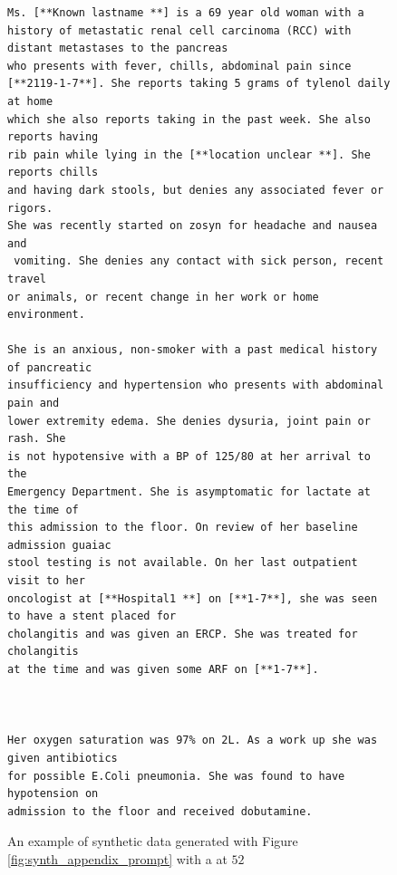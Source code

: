 \begin{figure}[hbt]
    \centering
    \begin{Verbatim}[breaklines=true, frame=single]
Ms. [**Known lastname **] is a 69 year old woman with a history of metastatic renal cell carcinoma (RCC) with distant metastases to the pancreas
who presents with fever, chills, abdominal pain since [**2119-1-7**]. She reports taking 5 grams of tylenol daily at home
which she also reports taking in the past week. She also reports having
rib pain while lying in the [**location unclear **]. She reports chills
and having dark stools, but denies any associated fever or rigors.
She was recently started on zosyn for headache and nausea and
 vomiting. She denies any contact with sick person, recent travel
or animals, or recent change in her work or home environment.

She is an anxious, non-smoker with a past medical history of pancreatic
insufficiency and hypertension who presents with abdominal pain and
lower extremity edema. She denies dysuria, joint pain or rash. She
is not hypotensive with a BP of 125/80 at her arrival to the
Emergency Department. She is asymptomatic for lactate at the time of
this admission to the floor. On review of her baseline admission guaiac
stool testing is not available. On her last outpatient visit to her
oncologist at [**Hospital1 **] on [**1-7**], she was seen to have a stent placed for
cholangitis and was given an ERCP. She was treated for cholangitis
at the time and was given some ARF on [**1-7**].



Her oxygen saturation was 97% on 2L. As a work up she was given antibiotics
for possible E.Coli pneumonia. She was found to have hypotension on
admission to the floor and received dobutamine.
    \end{Verbatim}
    \caption{An example of synthetic data generated with Figure \ref{fig:synth_appendix_prompt} with a \score at $52$}
    \label{fig:synth_appendix_worst}
\end{figure}

